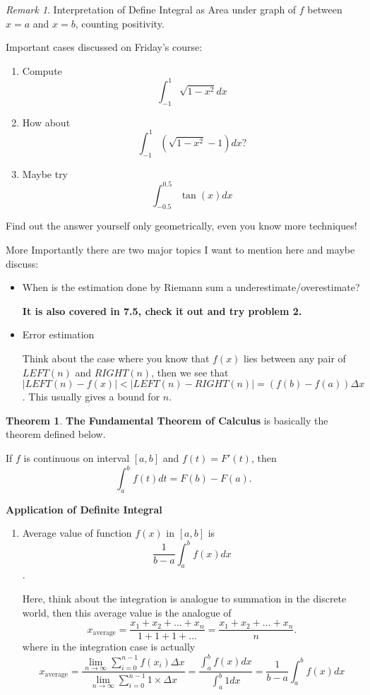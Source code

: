 \documentclass[12pt]{article}
\theoremstyle{definition}
\newtheorem{thm}{Theorem}[section]
\theoremstyle{definition}
\theoremstyle{remark}
\newtheorem*{remark}{Remark}
\theoremstyle{definition}
\theoremstyle{definition}
\theoremstyle{definition}
\begin{document}
\hrulefill

\begin{remark}
	Interpretation of Define Integral as Area under graph of $f$ between $x=a$ and $x=b$, counting positivity.
\end{remark}

Important cases discussed on Friday's course:
\begin{enumerate}
	\item Compute \[\int^{1}_{-1}\sqrt{1-x^2}dx\]
	\item How about \[\int^{1}_{-1}(\sqrt{1-x^2}-1)dx?\]
	\item Maybe try\[\int^{0.5}_{-0.5}\tan(x)dx\]
\end{enumerate}

Find out the answer yourself only geometrically, even you know more techniques!



More Importantly there are two major topics I want to mention here and maybe discuss:

\begin{itemize}
	\item When is the estimation done by Riemann sum a underestimate/overestimate?
	
\textbf{It is also covered in 7.5, check it out and try problem 2.}
	
	\item Error estimation
	
	Think about the case where you know that $f(x)$ lies between any pair of $LEFT(n)$ and $RIGHT(n)$, then we see that $|LEFT(n) - f(x)|<|LEFT(n)-RIGHT(n)|=(f(b)-f(a))\Delta x$. This usually gives a bound for $n$.
\end{itemize}

\hrulefill
\begin{thm}
\textbf{The Fundamental Theorem of Calculus} is basically the theorem defined below.

If $f$ is continuous on interval $[a,b]$ and $f(t)=F'(t)$, then \[\int^b_a f(t) dt = F(b)-F(a).\]
\end{thm}
\hrulefill

\textbf{Application of Definite Integral}

\begin{enumerate}
	\item Average value of function $f(x)$ in $[a,b]$ is \[\frac{1}{b-a} \int_{a}^{b}f(x)dx\].
	
	Here, think about the integration is analogue to summation in the discrete world, then this average value is the analogue of \[x_{\text{average}}=\frac{x_1+x_2+\ldots+x_n}{1+1+1+\dots}=\frac{x_1+x_2+\ldots+x_n}{n}.\] where in the integration case is actually \[x_{\text{average}}=\frac{\lim_{n\rightarrow \infty} \sum_{i=0}^{n-1} f(x_i)\Delta x}{\lim_{n\rightarrow \infty} \sum_{i=0}^{n-1} 1 \times \Delta x}=\frac{\int_{a}^{b}f(x)dx}{\int_{a}^{b}1 dx}=\frac{1}{b-a} \int_{a}^{b}f(x)dx\]
\end{enumerate}
\end{document}
